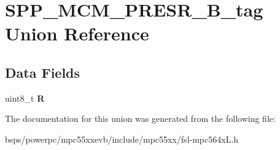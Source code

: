 \hypertarget{unionSPP__MCM__PRESR__8B__tag}{}\section{S\+P\+P\+\_\+\+M\+C\+M\+\_\+\+P\+R\+E\+S\+R\+\_\+B\+\_\+tag Union Reference}
\label{unionSPP__MCM__PRESR__8B__tag}
\subsection*{Data Fields}
\begin{DoxyCompactItemize}
\item 
\mbox{\label{unionSPP__MCM__PRESR__8B__tag_a3ac0d1bf85164f873e619dfad176272a}} 
uint8\+\_\+t {\bfseries R}
\end{DoxyCompactItemize}


The documentation for this union was generated from the following file\+:\begin{DoxyCompactItemize}
\item 
bsps/powerpc/mpc55xxevb/include/mpc55xx/fsl-\/mpc564x\+L.\+h\end{DoxyCompactItemize}
